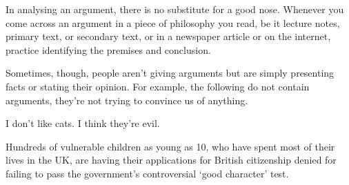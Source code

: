 



In analysing an argument, there is no substitute for a good nose.
Whenever you come across an argument in a
piece of philosophy you read, be it lecture notes,
primary text, or secondary text, or in a newspaper
article or on the internet, practice identifying the
premises and conclusion.

Sometimes, though, people aren't giving arguments but are simply presenting facts or stating their opinion.
For example, the following do not contain arguments, they're not trying to convince us of anything.
\begin{ebullet}
\item I don't like cats. I think they're evil.
\item Hundreds of vulnerable children as young as 10, who have spent most of their lives in the UK, are having their applications for British citizenship denied for failing to pass the government's controversial `good character' test.
\end{ebullet}


